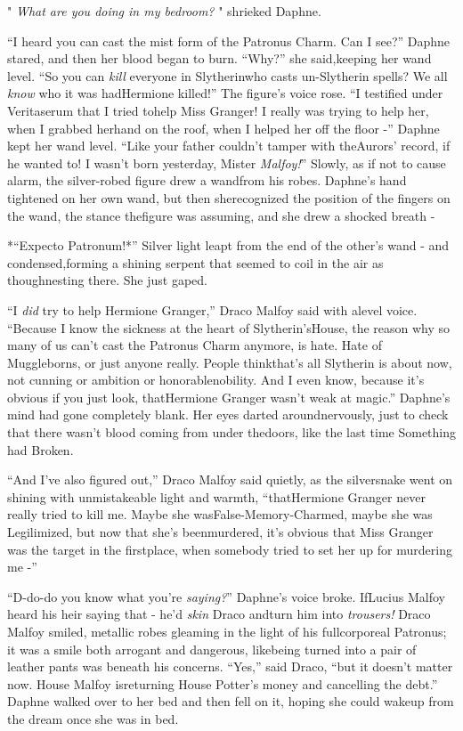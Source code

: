 " \emph{What are you doing in my bedroom?} " shrieked Daphne.

``I heard you can cast the mist form of the Patronus Charm. Can I see?''
Daphne stared, and then her blood began to burn. ``Why?'' she said,keeping her wand level. ``So you can \emph{kill} everyone in Slytherinwho casts un-Slytherin spells? We all \emph{know} who it was hadHermione killed!''
The figure's voice rose. ``I testified under Veritaserum that I tried tohelp Miss Granger! I really was trying to help her, when I grabbed herhand on the roof, when I helped her off the floor -''
Daphne kept her wand level. ``Like your father couldn't tamper with theAurors' record, if he wanted to! I wasn't born yesterday, Mister
\emph{Malfoy!}''
Slowly, as if not to cause alarm, the silver-robed figure drew a wandfrom his robes. Daphne's hand tightened on her own wand, but then sherecognized the position of the fingers on the wand, the stance thefigure was assuming, and she drew a shocked breath -

*``Expecto Patronum!*''
Silver light leapt from the end of the other's wand - and condensed,forming a shining serpent that seemed to coil in the air as thoughnesting there.
She just gaped.

``I \emph{did} try to help Hermione Granger,'' Draco Malfoy said with alevel voice. ``Because I know the sickness at the heart of Slytherin'sHouse, the reason why so many of us can't cast the Patronus Charm anymore, is hate. Hate of Muggleborns, or just anyone really. People thinkthat's all Slytherin is about now, not cunning or ambition or honorablenobility. And I even know, because it's obvious if you just look, thatHermione Granger wasn't weak at magic.''
Daphne's mind had gone completely blank. Her eyes darted aroundnervously, just to check that there wasn't blood coming from under thedoors, like the last time Something had Broken.

``And I've also figured out,'' Draco Malfoy said quietly, as the silversnake went on shining with unmistakeable light and warmth, ``thatHermione Granger never really tried to kill me. Maybe she wasFalse-Memory-Charmed, maybe she was Legilimized, but now that she's beenmurdered, it's obvious that Miss Granger was the target in the firstplace, when somebody tried to set her up for murdering me -''

``D-do-do you know what you're \emph{saying?}'' Daphne's voice broke. IfLucius Malfoy heard his heir saying that - he'd \emph{skin} Draco andturn him into \emph{trousers!}
Draco Malfoy smiled, metallic robes gleaming in the light of his fullcorporeal Patronus; it was a smile both arrogant and dangerous, likebeing turned into a pair of leather pants was beneath his concerns.
``Yes,'' said Draco, ``but it doesn't matter now. House Malfoy isreturning House Potter's money and cancelling the debt.''
Daphne walked over to her bed and then fell on it, hoping she could wakeup from the dream once she was in bed.

